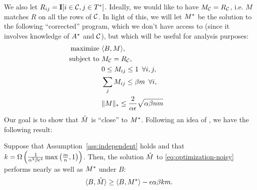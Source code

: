 We also let $R_{ij} = \mathbf{I}[i \in \mathcal{C}, j \in T^*]$.
Ideally, we would like to have $M_{\mathcal{C}} = R_{\mathcal{C}}$, i.e. $M$ matches $R$ on 
all the rows of $\mathcal{C}$. In light of this, 
we will let $M^*$ be the solution to the following ``corrected'' program, which 
we don't have access to (since it involves knowledge of $A^*$ and $\mathcal{C}$), 
but which will be useful for analysis purposes:
\begin{align}
\label{eq:optimization-noiseless}
\text{maximize } &\langle B, M \rangle, \\
\notag \text{ subject to } &M_{\mathcal{C}} = R_{\mathcal{C}}, \\
\notag  &0 \leq M_{ij} \leq 1 \,\,\, \forall i,j,  \\
\notag  &\sum_j M_{ij} \leq \beta m \,\,\, \forall i, \\
\notag  &\|M\|_* \leq \frac{2}{\alpha\epsilon}\sqrt{\alpha\beta nm} \phantom{xxxxxxx}
\end{align}
Our goal is to show that $\tilde{M}$ is ``close'' to $M^*$. 
Following an idea of \citet{guedon2014community}, we have the following result:
\begin{lemma}
\label{lem:objective-bound}
Suppose that Assumption~\ref{ass:independent} holds and that 
$k = \Omega\left( \frac{1}{\alpha^3\beta\epsilon^4}\max\left( \frac{m}{n},1 \right) \right)$. 
Then, the solution $\tilde{M}$ to \eqref{eq:optimization-noisy} performs nearly as 
well as $M^*$ under $B$:
\begin{equation}
\label{eq:objective-bound}
\langle B, \tilde{M} \rangle \geq \langle B, M^* \rangle - \epsilon \alpha\beta km.
\end{equation}
\end{lemma}

